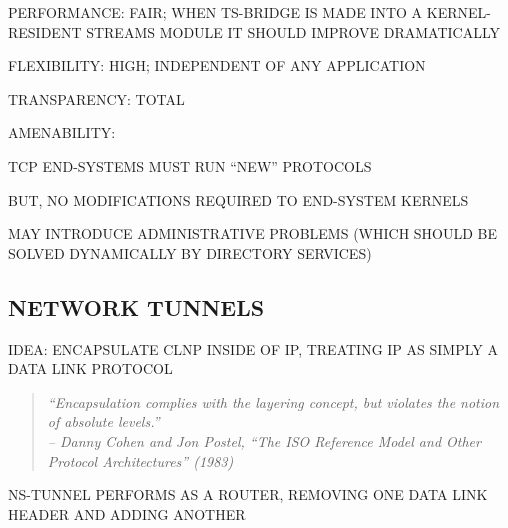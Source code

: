 \begin{bwslide}

\begin{nrtc}
\item	PERFORMANCE: FAIR; WHEN TS-BRIDGE IS MADE INTO A KERNEL-RESIDENT
	STREAMS MODULE IT SHOULD IMPROVE DRAMATICALLY

\item	FLEXIBILITY: HIGH; INDEPENDENT OF ANY APPLICATION

\item	TRANSPARENCY: TOTAL

\item	AMENABILITY:
    \begin{nrtc}
    \item	TCP END-SYSTEMS MUST RUN ``NEW'' PROTOCOLS
	\begin{nrtc}
	\item	BUT, NO MODIFICATIONS REQUIRED TO END-SYSTEM KERNELS
	\end{nrtc}

    \item	MAY INTRODUCE ADMINISTRATIVE PROBLEMS (WHICH SHOULD BE SOLVED
		DYNAMICALLY BY DIRECTORY SERVICES)
    \end{nrtc}
\end{nrtc}
\end{bwslide}


\begin{bwslide}
\part*	{NETWORK TUNNELS}\bf

\begin{nrtc}
\item	IDEA: ENCAPSULATE CLNP INSIDE OF IP, TREATING IP AS SIMPLY A DATA LINK
	PROTOCOL
\begin{quote}\em
``Encapsulation complies with the layering concept, but violates the notion
of absolute levels.''\\ \raggedleft
-- Danny Cohen and Jon Postel, ``The ISO Reference Model and Other Protocol
Architectures'' (1983)
\end{quote}

\item	NS-TUNNEL PERFORMS AS A ROUTER, REMOVING ONE DATA LINK HEADER AND
	ADDING ANOTHER
\end{nrtc}
\end{bwslide}




